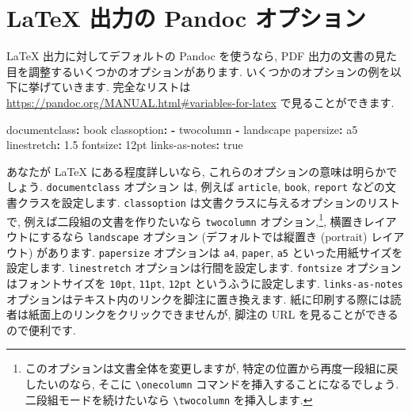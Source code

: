 \documentclass[
  11pt,
]{bxjsreport}
\newenvironment{Shaded}{\begin{snugshade}}{\end{snugshade}}
\newcommand{\AttributeTok}[1]{\textcolor[rgb]{0.77,0.63,0.00}{#1}}
\newcommand{\CharTok}[1]{\textcolor[rgb]{0.31,0.60,0.02}{#1}}
\newcommand{\FloatTok}[1]{\textcolor[rgb]{0.00,0.00,0.81}{#1}}
\newcommand{\FunctionTok}[1]{\textcolor[rgb]{0.00,0.00,0.00}{#1}}
\newcommand{\KeywordTok}[1]{\textcolor[rgb]{0.13,0.29,0.53}{\textbf{#1}}}
\begin{document}
\hypertarget{latex-variables}{%
\section{LaTeX 出力の Pandoc オプション}\label{latex-variables}}

LaTeX 出力に対してデフォルトの Pandoc を使うなら, PDF 出力の文書の見た目を調整するいくつかのオプションがあります. いくつかのオプションの例を以下に挙げていきます. 完全なリストは \url{https://pandoc.org/MANUAL.html\#variables-for-latex} で見ることができます.

\begin{Shaded}
\begin{Highlighting}[]
\FunctionTok{documentclass}\KeywordTok{:}\AttributeTok{ book}
\FunctionTok{classoption}\KeywordTok{:}
\AttributeTok{  }\KeywordTok{{-}}\AttributeTok{ twocolumn}
\AttributeTok{  }\KeywordTok{{-}}\AttributeTok{ landscape}
\FunctionTok{papersize}\KeywordTok{:}\AttributeTok{ a5}
\FunctionTok{linestretch}\KeywordTok{:}\AttributeTok{ }\FloatTok{1.5}
\FunctionTok{fontsize}\KeywordTok{:}\AttributeTok{ 12pt}
\FunctionTok{links{-}as{-}notes}\KeywordTok{:}\AttributeTok{ }\CharTok{true}
\end{Highlighting}
\end{Shaded}

あなたが LaTeX にある程度詳しいなら, これらのオプションの意味は明らかでしょう. \texttt{documentclass} オプション は, 例えば \texttt{article}, \texttt{book}, \texttt{report} などの文書クラスを設定します. \texttt{classoption} は文書クラスに与えるオプションのリストで, 例えば二段組の文書を作りたいなら \texttt{twocolumn} オプション,\footnote{このオプションは文書全体を変更しますが, 特定の位置から再度一段組に戻したいのなら, そこに \texttt{\textbackslash{}onecolumn} コマンドを挿入することになるでしょう. 二段組モードを続けたいなら \texttt{\textbackslash{}twocolumn} を挿入します.}, 横置きレイアウトにするなら \texttt{landscape} オプション (デフォルトでは縦置き (portrait) レイアウト) があります. \texttt{papersize} オプションは \texttt{a4}, \texttt{paper}, \texttt{a5} といった用紙サイズを設定します. \texttt{linestretch} オプションは行間を設定します. \texttt{fontsize} オプションはフォントサイズを \texttt{10pt}, \texttt{11pt}, \texttt{12pt} というふうに設定します. \texttt{links-as-notes} オプションはテキスト内のリンクを脚注に置き換えます. 紙に印刷する際には読者は紙面上のリンクをクリックできませんが, 脚注の URL を見ることができるので便利です.
\end{document}
